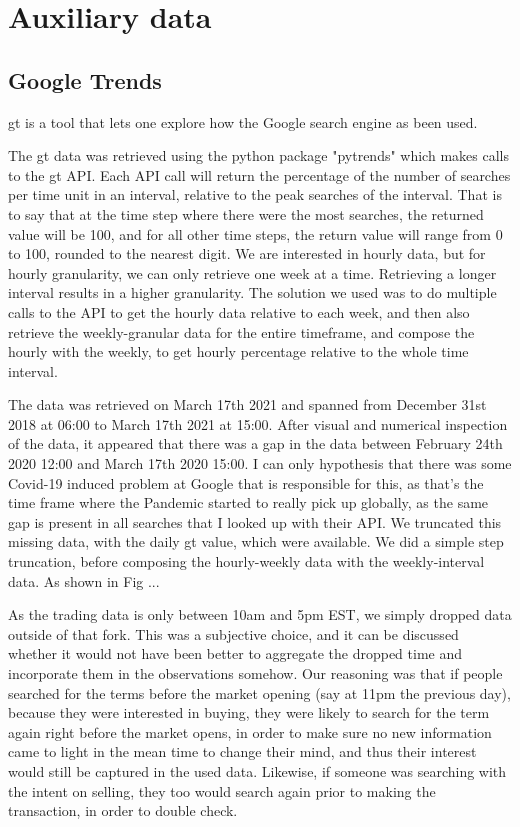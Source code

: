 \section{Auxiliary data}
\subsection{Google Trends}
\acrfull{gt} is a tool that lets one explore how the Google search engine as been used.

The \acrlong{gt} data was retrieved using the python package "pytrends" which makes calls to the \acrlong{gt} \Gls{API}. Each \Gls{API} call will return the percentage of the number of searches per time unit in an interval, relative to the peak searches of the interval. That is to say that at the time step where there were the most searches, the returned value will be 100, and for all other time steps, the return value will range from 0 to 100, rounded to the nearest digit.
We are interested in hourly data, but for hourly granularity, we can only retrieve one week at a time. Retrieving a longer interval results in a higher granularity. The solution we used was to do multiple calls to the \Gls{API} to get the hourly data relative to each week, and then also retrieve the weekly-granular data for the entire timeframe, and compose the hourly with the weekly, to get hourly percentage relative to the whole time interval.

The data was retrieved on March 17th 2021 and spanned from December 31st 2018 at 06:00 to March 17th 2021 at 15:00.
After visual and numerical inspection of the data, it appeared that there was a gap in the data between February 24th 2020 12:00 and March 17th 2020 15:00. I can only hypothesis that there was some Covid-19 induced problem at Google that is responsible for this, as that's the time frame where the Pandemic started to really pick up globally, as the same gap is present in all searches that I looked up with their \Gls{API}. 
We truncated this missing data, with the daily \acrshort{gt} value, which were available. We did a simple step truncation, before composing the hourly-weekly data with the weekly-interval data. As shown in Fig ...

As the trading data is only between 10am and 5pm EST, we simply dropped data outside of that fork. This was a subjective choice, and it can be discussed whether it would not have been better to aggregate the dropped time and incorporate them in the observations somehow. Our reasoning was that if people searched for the terms before the market opening (say at 11pm the previous day), because they were interested in buying, they were likely to search for the term again right before the market opens, in order to make sure no new information came to light in the mean time to change their mind, and thus their interest would still be captured in the used data. Likewise, if someone was searching with the intent on selling, they too would search again prior to making the transaction, in order to double check.

